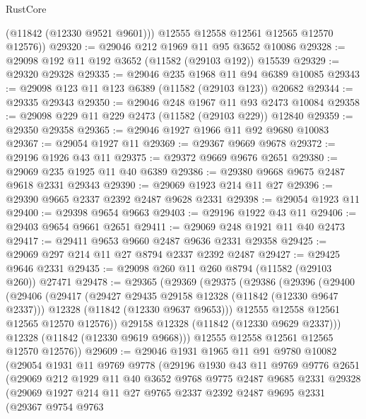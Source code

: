 \begin{lexlean}{RustCore}
\begin{coremodule}
          (@11842 (@12330 @9521 @9601)))
        @12555
        @12558
        @12561
        @12565
        @12570
        @12576))
@29320 := @29046 @212 @1969 @11 @95 @3652 @10086
@29328 := @29098 @192 @11 @192 @3652 (@11582 (@29103 @192)) @15539
@29329 := @29320 @29328
@29335 := @29046 @235 @1968 @11 @94 @6389 @10085
@29343 := @29098 @123 @11 @123 @6389 (@11582 (@29103 @123)) @20682
@29344 := @29335 @29343
@29350 := @29046 @248 @1967 @11 @93 @2473 @10084
@29358 := @29098 @229 @11 @229 @2473 (@11582 (@29103 @229)) @12840
@29359 := @29350 @29358
@29365 := @29046 @1927 @1966 @11 @92 @9680 @10083
@29367 := @29054 @1927 @11
@29369 := @29367 @9669 @9678
@29372 := @29196 @1926 @43 @11
@29375 := @29372 @9669 @9676 @2651
@29380 := @29069 @235 @1925 @11 @40 @6389
@29386 := @29380 @9668 @9675 @2487 @9618 @2331 @29343
@29390 := @29069 @1923 @214 @11 @27
@29396 := @29390 @9665 @2337 @2392 @2487 @9628 @2331
@29398 := @29054 @1923 @11
@29400 := @29398 @9654 @9663
@29403 := @29196 @1922 @43 @11
@29406 := @29403 @9654 @9661 @2651
@29411 := @29069 @248 @1921 @11 @40 @2473
@29417 := @29411 @9653 @9660 @2487 @9636 @2331 @29358
@29425 := @29069 @297 @214 @11 @27 @8794 @2337 @2392 @2487
@29427 := @29425 @9646 @2331
@29435 := @29098 @260 @11 @260 @8794 (@11582 (@29103 @260)) @27471
@29478 := @29365
    (@29369
      (@29375
        (@29386
          (@29396
            (@29400
              (@29406
                (@29417
                  (@29427 @29435 @29158 @12328 (@11842 (@12330 @9647 @2337)))
                  @12328
                  (@11842 (@12330 @9637 @9653)))
                @12555
                @12558
                @12561
                @12565
                @12570
                @12576))
            @29158
            @12328
            (@11842 (@12330 @9629 @2337)))
          @12328
          (@11842 (@12330 @9619 @9668)))
        @12555
        @12558
        @12561
        @12565
        @12570
        @12576))
@29609 := @29046
    @1931
    @1965
    @11
    @91
    @9780
    @10082
    (@29054
      @1931
      @11
      @9769
      @9778
      (@29196
        @1930
        @43
        @11
        @9769
        @9776
        @2651
        (@29069
          @212
          @1929
          @11
          @40
          @3652
          @9768
          @9775
          @2487
          @9685
          @2331
          @29328
          (@29069
            @1927
            @214
            @11
            @27
            @9765
            @2337
            @2392
            @2487
            @9695
            @2331
            (@29367
              @9754
              @9763

\end{coremodule}
\end{lexlean}
